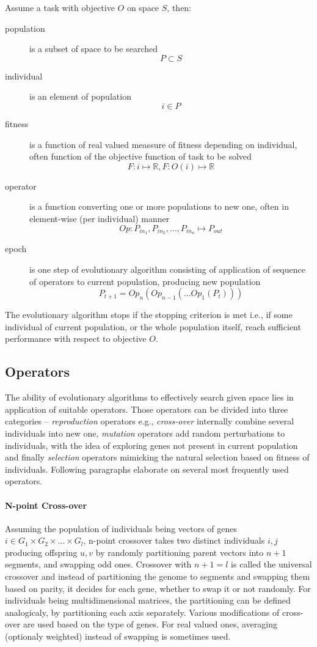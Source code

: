 Assume a task with objective $O$ on space $S$, then:

\begin{description}
\item[population] is a subset of space to be searched
$$P \subset S$$
\item[individual] is an element of population
$$i \in P$$
\item[fitness] is a function of real valued meassure of fitness depending on individual, often function of the objective function of task to be solved
$$F: i \mapsto \mathbb{R}, F: O(i) \mapsto \mathbb{R}$$
\item[operator] is a function converting one or more populations to new one, often in element-wise (per individual) manner
$$Op: P_{in_1}, P_{in_2}, \dots, P_{in_n} \mapsto P_{out}$$
\item[epoch] is one step of evolutionary algorithm consisting of application of sequence of operators to current population, producing new population
$$P_{t+1} = Op_n(Op_{n-1}(\dots Op_1(P_t)))$$
\end{description}

The evolutionary algorithm stops if the stopping criterion is met i.e., if some individual of current population, or the whole population itself, reach sufficient performance with respect to objective $O$.

\subsection{Operators}
The ability of evolutionary algorithms to effectively search given space lies in application of suitable operators. Those operators can be divided into three categories -- \textit{reproduction} operators e.g., \textit{cross-over} internally combine several individuals into new one, \textit{mutation} operators add random perturbations to individuals, with the idea of exploring genes not present in current population and finally \textit{selection} operators mimicking the natural selection based on fitness of individuals. Following paragraphs elaborate on several most frequently used operators.

\paragraph{N-point Cross-over}
Assuming the population of individuals being vectors of genes $i \in G_1 \times G_2 \times \dots \times G_l$, n-point crossover takes two distinct individuals $i, j$ producing offspring $u, v$ by randomly partitioning parent vectors into $n+1$ segments, and swapping odd ones. Crossover with $n + 1 = l$ is called the universal crossover and instead of partitioning the genome to segments and swapping them based on parity, it decides for each gene, whether to swap it or not randomly. For individuals being multidimensional matrices, the partitioning can be defined analogicaly, by partitioning each axis separately. Various modifications of cross-over are used based on the type of genes. For real valued ones, averaging (optionaly weighted) instead of swapping is sometimes used.

